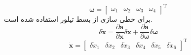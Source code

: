 \begin{equation}
	\boldsymbol{\omega} = \begin{bmatrix}
		\omega_1&\omega_2&\omega_3&\omega_4
	\end{bmatrix}^\mathrm{T}
\end{equation}
برای خطی سازی از بسط تیلور استفاده شده ‌است.
\begin{equation}
	\delta \dot{\boldsymbol{x}} = \dfrac{\partial  \boldsymbol a}{\partial  \boldsymbol x}\delta \boldsymbol x + \dfrac{\partial \boldsymbol a}{\partial \boldsymbol \omega}\delta \boldsymbol \omega 
\end{equation}
\begin{equation}
	\dot{\boldsymbol{x}} =
	\begin{bmatrix}
		\delta \dot x_1&
		\delta \dot x_2&
		\delta \dot x_3&
		\delta \dot x_4&
		\delta \dot x_5&
		\delta \dot x_6
	\end{bmatrix}^\mathrm{T}
\end{equation}

